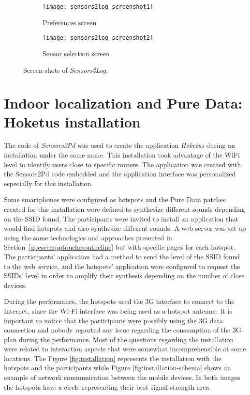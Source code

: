 \begin{figure*}[!ht]
	\centering
	\begin{subfigure}{.35\textwidth}
		\texttt{[image: sensors2log\_screenshot1]}
		\caption{Preferences screen}
		\label{fig:appsensors2log1}
	\end{subfigure}
	\begin{subfigure}{.35\textwidth}
		\texttt{[image: sensors2log\_screenshot2]}
		\caption{Sensor selection screen}
		\label{fig:appsensors2log2}
	\end{subfigure}
	
	\caption{Screen-shots of \textit{Sensors2Log}.}
	\label{fig:sensors2log}
\end{figure*}

\section{Indoor localization and Pure Data: Hoketus installation}
\label{apesec:apphoketus}

The code of \textit{Sensors2Pd} was used to create the application \textit{Hoketus} during an installation under the same name.
This installation took advantage of the WiFi level to identify users close to specific routers.
The application was created with the Sensors2Pd code embedded and the application interface was personalized especially for this installation. 

Some smartphones were configured as hotspots and the Pure Data patches created for this installation were defined to synthesize different sounds depending on the SSID found.
The participants were invited to install an application that would find hotspots and also synthesize different sounds.
A web server was set up using the same technologies and approaches presented in Section~\ref{apesec:apptouchesontheline} but with specific pages for each hotspot.
The participants' application had a method to send the level of the SSID found to the web service, and the hotspots' application were configured to request the SSIDs' level in order to amplify their synthesis depending on the number of close devices.

During the performance, the hotspots used the 3G interface to connect to the Internet, since the Wi-Fi interface was being used as a hotspot antenna. 
It is important to notice that the participants were possibly using the 3G data connection and nobody reported any issue regarding the consumption of the 3G plan during the performance.
Most of the questions regarding the installation were related to interaction aspects that were somewhat incomprehensible at some locations.
The Figure \ref{fig:installation} represents the installation with the hotspots and the participants while Figure \ref{fig:installation-schema} shows an example of network communication between the mobile devices. 
In both images the hotspots have a circle representing their best signal strength area.

